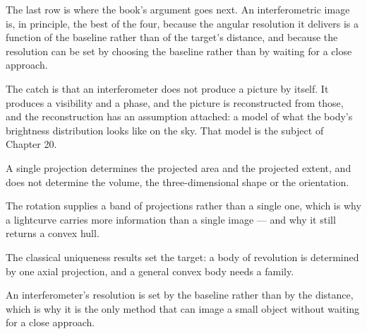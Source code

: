The last row is where the book's argument goes next. An interferometric
image is, in principle, the best of the four, because the angular resolution
it delivers is a function of the baseline rather than of the target's
distance, and because the resolution can be set by choosing the baseline
rather than by waiting for a close approach.

The catch is that an interferometer does not produce a picture by itself. It
produces a visibility and a phase, and the picture is reconstructed from
those, and the reconstruction has an assumption attached: a model of what
the body's brightness distribution looks like on the sky. That model is the
subject of Chapter 20.

\begin{keytakeaways}
\item A single projection determines the projected area and the projected
extent, and does not determine the volume, the three-dimensional shape or
the orientation.
\item The rotation supplies a band of projections rather than a single one,
which is why a lightcurve carries more information than a single image ---
and why it still returns a convex hull.
\item The classical uniqueness results set the target: a body of revolution
is determined by one axial projection, and a general convex body needs a
family.
\item An interferometer's resolution is set by the baseline rather than by
the distance, which is why it is the only method that can image a small
object without waiting for a close approach.
\end{keytakeaways}
